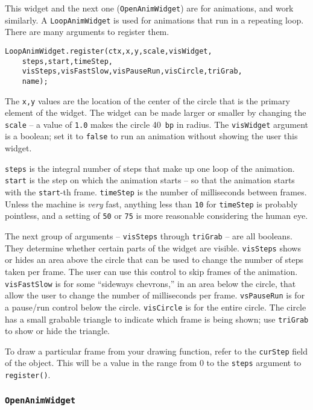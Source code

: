 \documentclass[10pt]{article}
\begin{document}
This widget and the next one ({\tt OpenAnimWidget}) are for
animations, and work similarly. A {\tt LoopAnimWidget} is used for
animations that run in a repeating loop. There are many arguments to
register them.
\begin{verbatim}
LoopAnimWidget.register(ctx,x,y,scale,visWidget,
    steps,start,timeStep,
    visSteps,visFastSlow,visPauseRun,visCircle,triGrab,
    name);
\end{verbatim}
The {\tt x,y} values are the location of the center of the circle that
is the primary element of the widget. The widget can be made larger or
smaller by changing the {\tt scale} -- a value of {\tt 1.0} makes the
circle 40~{\tt bp} in radius. The {\tt visWidget} argument is a
boolean; set it to {\tt false} to run an animation without
showing the user this widget.

{\tt steps} is the integral number of steps that make up one loop of
the animation. {\tt start} is the step on which the animation
starts -- so that the animation starts with the {\tt start}-th
frame. {\tt timeStep} is the number of milliseconds between
frames. Unless the machine is \emph{very} fast, anything less than
{\tt 10} for {\tt timeStep} is probably pointless, and a setting of
{\tt 50} or {\tt 75} is more reasonable considering the human eye.

The next group of arguments -- {\tt visSteps} through {\tt triGrab} -- are
all booleans. They determine whether certain parts of the widget are
visible. {\tt visSteps} shows or hides an area above the circle that
can be used to change the number of steps taken per frame. The user
can use this control to skip frames of the animation. {\tt
  visFastSlow} is for some ``sideways chevrons,'' in an area below the circle,
that allow the user to change the number of milliseconds per
frame. {\tt vsPauseRun} is for a pause/run control below the
circle. {\tt visCircle} is for the entire circle. The circle has a
small grabable triangle to indicate which frame is being shown; use
{\tt triGrab} to show or hide the triangle.

To draw a particular frame from your drawing function, refer to the
{\tt curStep} field of the object. This will be a value in the range
from 0 to the {\tt steps} argument to {\tt register()}. 

\subsubsection{\tt OpenAnimWidget}
\end{document}
